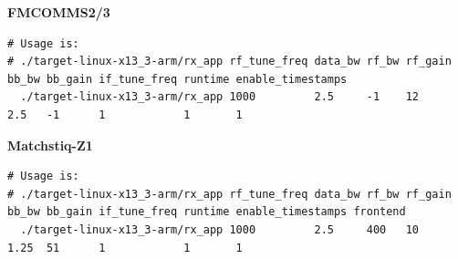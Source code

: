 \small
\noindent\textbf{FMCOMMS2/3}
\scriptsize
\begin{verbatim}
# Usage is:
# ./target-linux-x13_3-arm/rx_app rf_tune_freq data_bw rf_bw rf_gain bb_bw bb_gain if_tune_freq runtime enable_timestamps
  ./target-linux-x13_3-arm/rx_app 1000         2.5     -1    12      2.5   -1      1            1       1
\end{verbatim}
\par\medskip
\small


\noindent\textbf{Matchstiq-Z1}\\
\scriptsize
\noindent
\begin{verbatim}
# Usage is:
# ./target-linux-x13_3-arm/rx_app rf_tune_freq data_bw rf_bw rf_gain bb_bw bb_gain if_tune_freq runtime enable_timestamps frontend
  ./target-linux-x13_3-arm/rx_app 1000         2.5     400   10      1.25  51      1            1       1
\end{verbatim}
\par\medskip

